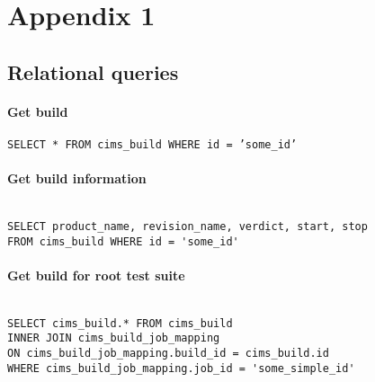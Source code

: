\appendix
\chapter{Appendix 1}
\label{appendix1}
\section*{Relational queries}
\label{relationalqueries}
\subsubsection*{Get build}
\label{q:getbuild}
{\tt SELECT * FROM cims\_build WHERE id = 'some\_id'}

\subsubsection*{Get build information}
\label{q:getbuildinfo}
\begin{verbatim}

SELECT product_name, revision_name, verdict, start, stop
FROM cims_build WHERE id = 'some_id'
\end{verbatim}

\subsubsection*{Get build for root test suite}
\label{q:getbuildforroot}
\begin{verbatim}

SELECT cims_build.* FROM cims_build
INNER JOIN cims_build_job_mapping
ON cims_build_job_mapping.build_id = cims_build.id   
WHERE cims_build_job_mapping.job_id = 'some_simple_id'
\end{verbatim} 



